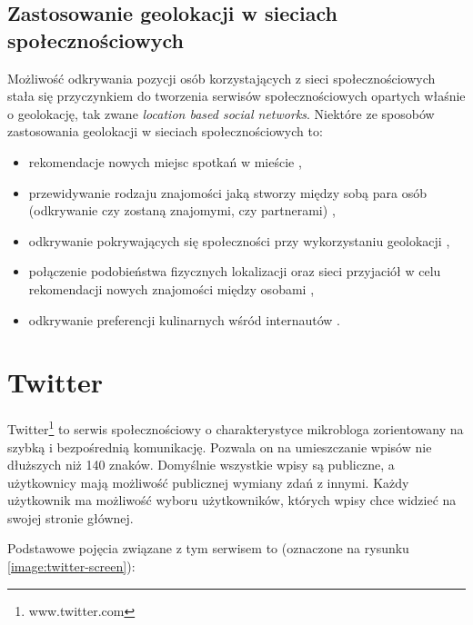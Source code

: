 \subsection{Zastosowanie geolokacji w sieciach społecznościowych}
Możliwość odkrywania pozycji osób korzystających z sieci społecznościowych
stała się przyczynkiem do tworzenia serwisów społecznościowych opartych
właśnie o geolokację, tak zwane \textit{location based social networks}.
Niektóre ze sposobów zastosowania geolokacji w sieciach społecznościowych to:

\begin{itemize}
  \item rekomendacje nowych miejsc spotkań w mieście 
  \cite{ARandomWalkAroundTheCity},
  
  \item przewidywanie rodzaju znajomości jaką stworzy między sobą para osób
  (odkrywanie czy zostaną znajomymi, czy partnerami)
  \cite{AcquaintanceOrPartnerPredictingPartnership},
  
  \item odkrywanie pokrywających się społeczności przy wykorzystaniu geolokacji
  \cite{DiscoveringAndProfilingOverlappingCommunities},
  
  \item połączenie podobieństwa fizycznych lokalizacji oraz sieci przyjaciół w
  celu rekomendacji nowych znajomości między osobami 
  \cite{RecommendingFriendsInstantly},
  
  \item odkrywanie preferencji kulinarnych wśród internautów 
  \cite{WhatCuisineDoYouLike}.
\end{itemize}



\section{Twitter}
Twitter\footnote{www.twitter.com} to serwis społecznościowy o charakterystyce mikrobloga zorientowany
na szybką i bezpośrednią komunikację. Pozwala on
na umieszczanie wpisów nie dłuższych niż 140 znaków. Domyślnie wszystkie 
wpisy są publiczne, a użytkownicy mają możliwość publicznej wymiany zdań
z innymi. Każdy użytkownik ma możliwość wyboru użytkowników, których
wpisy chce widzieć na swojej stronie głównej.

Podstawowe pojęcia związane z tym serwisem to (oznaczone na rysunku \ref{image:twitter-screen}):

